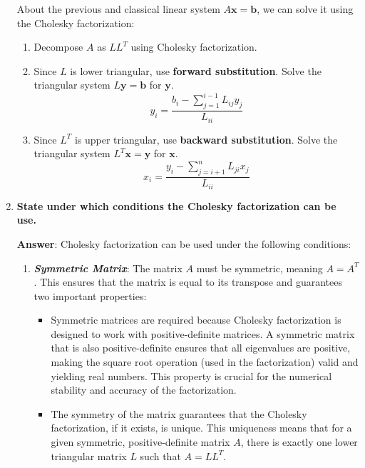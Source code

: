 \begin{enumerate}[label=\textcolor{Green3}{\textbf{\arabic*.}}]
    About the previous and classical linear system $A\mathbf{x} = \mathbf{b}$, we can solve it using the Cholesky factorization:
    \begin{enumerate}
        \item Decompose $A$ as $LL^T$ using Cholesky factorization.
        \item Since $L$ is lower triangular, use \textbf{forward substitution}. Solve the triangular system $L\mathbf{y} = \mathbf{b}$ for $\mathbf{y}$.
        \begin{equation*}
            y_{i} = \dfrac{b_{i} - \displaystyle\sum_{j=1}^{i-1} L_{ij} y_{j}}{L_{ii}}
        \end{equation*}
        \item Since $L^{T}$ is upper triangular, use \textbf{backward substitution}. Solve the triangular system $L^{T}\mathbf{x} = \mathbf{y}$ for $\mathbf{x}$.
        \begin{equation*}
            x_{i} = \dfrac{y_{i} - \displaystyle\sum_{j=i+1}^{n} L_{ji} x_{j}}{L_{ii}}
        \end{equation*}
    \end{enumerate}


    \newpage

    \item \textcolor{Green3}{\textbf{%
        State under which conditions the Cholesky factorization can be use.%
    }}

    \textbf{Answer}: Cholesky factorization can be used under the following conditions:
    \begin{enumerate}
        \item \textbf{\emph{Symmetric Matrix}}: The matrix $A$ must be symmetric, meaning $A = A^T$. This ensures that the matrix is equal to its transpose and guarantees two important properties:
        \begin{itemize}
            \item Symmetric matrices are required because Cholesky factorization is designed to work with positive-definite matrices. A symmetric matrix that is also positive-definite ensures that all eigenvalues are positive, making the square root operation (used in the factorization) valid and yielding real numbers. This property is crucial for the numerical stability and accuracy of the factorization.
            \item The symmetry of the matrix guarantees that the Cholesky factorization, if it exists, is unique. This uniqueness means that for a given symmetric, positive-definite matrix $A$, there is exactly one lower triangular matrix $L$ such that $A = LL^{T}$.
        \end{itemize}


\end{enumerate}
\end{enumerate}
